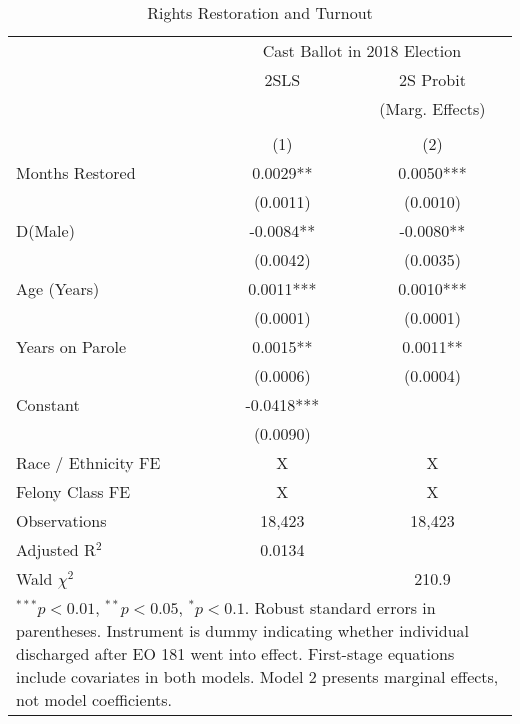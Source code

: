 \documentclass[
  12pt,
]{article}
\begin{document}
\begin{singlespace}
\begin{table}[H]
\caption{\label{tab:iv-models-chunk-time}\label{tab:iv-models-time} Rights Restoration and Turnout}
\fontsize{10}{12}\selectfont
\centering

\begin{tabular}{lcc}
\\[-1.8ex]\hline
& \multicolumn{2}{c}{Cast Ballot in 2018 Election} \\
& \multicolumn{1}{c}{2SLS} & \multicolumn{1}{c}{2S Probit}\\
& &  \multicolumn{1}{c}{(Marg. Effects)}\\
\cmidrule(l{3pt}r{3pt}){2-2} \cmidrule(l{3pt}r{3pt}){3-3}
\\[-1.8ex] & (1) & (2) \\
\hline
Months Restored & 0.0029** & 0.0050*** \\
 & (0.0011) & (0.0010) \\
D(Male) & -0.0084** & -0.0080** \\
 & (0.0042) & (0.0035) \\
Age (Years) & 0.0011*** & 0.0010*** \\
 & (0.0001) & (0.0001) \\
Years on Parole & 0.0015** & 0.0011** \\
 & (0.0006) & (0.0004) \\
Constant & -0.0418*** &  \\
 & (0.0090) &  \\
\hline
Race / Ethnicity FE & X & X \\
Felony Class FE & X & X \\
\hline
Observations & 18,423 & 18,423 \\
Adjusted R$^2$ & 0.0134 &  \\
 Wald $\chi^2$ &  & 210.9 \\
\hline
\multicolumn{3}{l}{\scriptsize{\parbox{.5\linewidth}{\vspace{2pt}$^{***}p<0.01$, $^{**}p<0.05$, $^*p<0.1$. \\
Robust standard errors in parentheses. \\
Instrument is dummy indicating whether \\
individual discharged after EO 181 went into effect. \\
First-stage equations include covariates in both models. \\
Model 2 presents marginal effects, not model coefficients.}}}
\end{tabular}
\end{table}

\end{singlespace}
\end{document}
